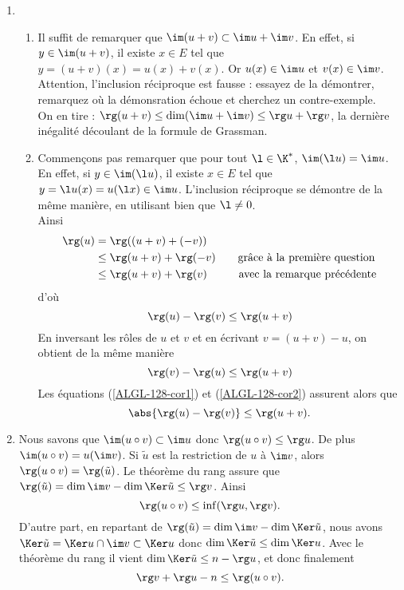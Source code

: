 \begin{enumerate}
\item
\begin{enumerate}
 \item Il suffit de remarquer que $\im(u+v)\subset \im u +\im v$. En effet, si $y\in\im(u+v)$, il existe $x\in E$ tel que $y=(u+v)(x)=u(x)+v(x)$. Or $u(x)\in\im u$ et $v(x)\in\im v$.\\
 Attention, l'inclusion réciproque est fausse : essayez de la démontrer, remarquez où la démonsration échoue et cherchez un contre-exemple.\\
 On en tire : $\rg(u+v)\leq \dim(\im u +\im v)\leq \rg u+\rg v$, la dernière inégalité découlant de la formule de Grassman.

\item Commençons pas remarquer que pour tout $\l\in\K^\ast$, $\im(\l u)=\im u$. En effet, si $y\in\im(\l u)$, il existe $x\in E$ tel que $y=\l u(x)=u(\l x)\in \im u$. L'inclusion réciproque se démontre de la même manière, en utilisant bien que $\l\neq 0$.\\
Ainsi
\begin{align*}
\rg(u)&=\rg((u+v)+(-v))\\
&\leq\rg(u+v)+\rg(-v)\hspace{.7cm}\text{grâce à la première question}\\
&\leq\rg(u+v)+\rg(v)\hspace{1cm}\text{avec la remarque précédente}
\end{align*}
d'où
\begin{equation}\label{ALGL-128-cor1}
\rg(u)-\rg(v)\leq\rg(u+v)
\end{equation}
En inversant les rôles de $u$ et $v$ et en écrivant $v=(u+v)-u$, on obtient de la même manière
\begin{equation}\label{ALGL-128-cor2}
\rg(v)-\rg(u)\leq\rg(u+v)
\end{equation}
Les équations (\ref{ALGL-128-cor1}) et (\ref{ALGL-128-cor2}) assurent alors que
$$\abs{\rg(u)-\rg(v)}\leq \rg(u+v).$$
\end{enumerate}
\item Nous savons que $\im(u\circ v)\subset\im u$ donc $\rg(u\circ v)\leq\rg u$. De plus $\im(u\circ v)=u(\im v)$. Si $\tilde u$ est la restriction de $u$ à $\im v$, alors $\rg(u\circ v)=\rg(\tilde u)$. Le théorème du rang assure que $\rg(\tilde u)= \dim\im v-\dim\Ker\tilde u\leq \rg v$. Ainsi
$$\rg(u\circ v)\leq\inf(\rg u,\rg v).$$
D'autre part, en repartant de $\rg(\tilde u)= \dim\im v-\dim\Ker\tilde u$, nous avons $\Ker\tilde u=\Ker u\cap\im v\subset\Ker u$ donc $\dim\Ker\tilde u\leq\dim\Ker u$. Avec le théorème du rang il vient $\dim\Ker\tilde u\leq n-\rg u$, et donc finalement
$$\rg v+\rg u-n\leq\rg(u\circ v).$$

\end{enumerate}

